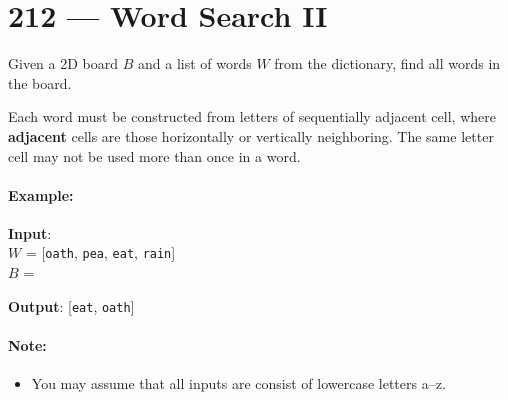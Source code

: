 \section{212 --- Word Search II}
Given a 2D board $B$ and a list of words $W$ from the dictionary, find all words in the board.
\par
Each word must be constructed from letters of sequentially adjacent cell, where \textbf{adjacent} cells are those horizontally or vertically neighboring. The same letter cell may not be used more than once in a word.
\paragraph{Example:}
\begin{flushleft}
\textbf{Input}:
\\
$W$ = [\texttt{oath}, \texttt{pea}, \texttt{eat}, \texttt{rain}]
\\
$B$ =
\begin{figure}[H]
\end{figure} 
\textbf{Output}: [\texttt{eat}, \texttt{oath}]
\end{flushleft}
\paragraph{Note:}
\begin{itemize}
\item You may assume that all inputs are consist of lowercase letters a--z.
\end{itemize}
